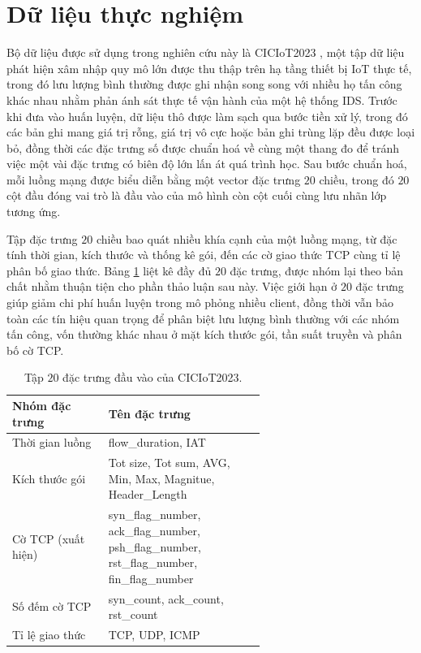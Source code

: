 \section{Dữ liệu thực nghiệm}

Bộ dữ liệu được sử dụng trong nghiên cứu này là CICIoT2023 \cite{ciciot2023}, một tập dữ liệu phát hiện xâm nhập quy mô lớn được thu thập trên hạ tầng thiết bị IoT thực tế, trong đó lưu lượng bình thường được ghi nhận song song với nhiều họ tấn công khác nhau nhằm phản ánh sát thực tế vận hành của một hệ thống IDS. Trước khi đưa vào huấn luyện, dữ liệu thô được làm sạch qua bước tiền xử lý, trong đó các bản ghi mang giá trị rỗng, giá trị vô cực hoặc bản ghi trùng lặp đều được loại bỏ, đồng thời các đặc trưng số được chuẩn hoá về cùng một thang đo để tránh việc một vài đặc trưng có biên độ lớn lấn át quá trình học. Sau bước chuẩn hoá, mỗi luồng mạng được biểu diễn bằng một vector đặc trưng $20$ chiều, trong đó $20$ cột đầu đóng vai trò là đầu vào của mô hình còn cột cuối cùng lưu nhãn lớp tương ứng.

Tập đặc trưng $20$ chiều bao quát nhiều khía cạnh của một luồng mạng, từ đặc tính thời gian, kích thước và thống kê gói, đến các cờ giao thức TCP cùng tỉ lệ phân bố giao thức. Bảng \ref{tab:cic23_features} liệt kê đầy đủ $20$ đặc trưng, được nhóm lại theo bản chất nhằm thuận tiện cho phần thảo luận sau này. Việc giới hạn ở $20$ đặc trưng giúp giảm chi phí huấn luyện trong mô phỏng nhiều client, đồng thời vẫn bảo toàn các tín hiệu quan trọng để phân biệt lưu lượng bình thường với các nhóm tấn công, vốn thường khác nhau ở mặt kích thước gói, tần suất truyền và phân bố cờ TCP.

\begin{table}[H]
    \centering
    \caption{Tập $20$ đặc trưng đầu vào của CICIoT2023.}
    \label{tab:cic23_features}
    \begin{tabular}{lp{0.62\linewidth}}
        \hline
        Nhóm đặc trưng & Tên đặc trưng \\
        \hline
        Thời gian luồng       & flow\_duration, IAT \\
        Kích thước gói        & Tot size, Tot sum, AVG, Min, Max, Magnitue, Header\_Length \\
        Cờ TCP (xuất hiện)    & syn\_flag\_number, ack\_flag\_number, psh\_flag\_number, rst\_flag\_number, fin\_flag\_number \\
        Số đếm cờ TCP            & syn\_count, ack\_count, rst\_count \\
        Tỉ lệ giao thức       & TCP, UDP, ICMP \\
        \hline
    \end{tabular}
\end{table}

